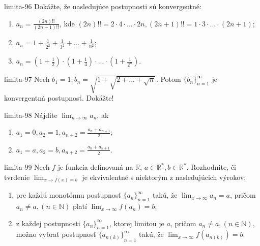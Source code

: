 \begin{defproblem}{limita-96}
Dokážte, že nasledujúce postupnosti sú konvergentné:
\begin{enumerate}
\item $a_n=\frac{(2n)!!}{(2n+1)!!}$, kde $(2n)!!=2\cdot4\cdot...\cdot2n,(2n+1)!!=1\cdot3\cdot...\cdot(2n+1)$;
\item $a_n=1+\frac{1}{2^2}+\frac{1}{3^2}+...+\frac{1}{n^2}$;
\item $a_n=(1+\frac{1}{2})\cdot(1+\frac{1}{4})\cdot...\cdot(1+\frac{1}{2^n})$.
\end{enumerate}
\end{defproblem}

\begin{defproblem}{limita-97}
Nech $b_1=1,b_n=\sqrt{1+\sqrt{2+...+\sqrt{n}}}$. Potom ${\{b_n\}}_{n=1}^\infty$ je konvergentná postupnosť. Dokážte!
\end{defproblem}

\begin{defproblem}{limita-98}
Nájdite $\lim_{n \rightarrow \infty} a_n$, ak
\begin{multicols}{2}
\begin{enumerate}
    \item $a_1=0,a_2=1,a_{n+2}=\frac{a_n+a_{n+1}}{2}$;
    \item $a_1=a,a_2=b,a_{n+2}=\frac{a_n+a_{n+1}}{2}$.
\end{enumerate}
\end{multicols}
\end{defproblem}

\begin{defproblem}{limita-99}
Nech $f$ je funkcia definovaná na $\mathbb{R}$, $a \in \mathbb{R^*},b \in \mathbb{R^*}$. Rozhodnite, či tvrdenie $\lim_{x \rightarrow f(x)=b}$ je ekvivalentné s niektorým z nasledujúcich výrokov:
\begin{enumerate}
\item pre každú monotónnu postupnosť ${\{a_n\}}_{n=1}^\infty$ takú, že $\lim_{x \rightarrow \infty} a_n=a$, pričom $a_n \neq a,(n \in \mathbb{N})$ platí $\lim_{x \rightarrow \infty} f(a_n)=b$;
\item z každej postupnosti ${\{a_n\}}_{n=1}^\infty$, ktorej limitou je $a$, pričom $a_n \neq a ,(n \in \mathbb{N})$, možno vybrať postupnosť ${\{a_{n(k)}\}}_{n=1}^\infty$ takú, že $\lim_{x \rightarrow \infty} f(a_{n(k)})=b$.
\end{enumerate}
\end{defproblem}

